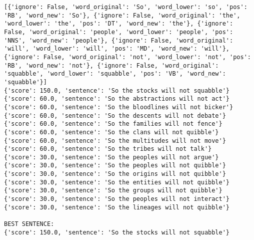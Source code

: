\documentclass[12pt,a4paper,oneside]{book}
\begin{document}
\begin{verbatim}
[{'ignore': False, 'word_original': 'So', 'word_lower': 'so', 'pos': 'RB', 'word_new': 'So'}, {'ignore': False, 'word_original': 'the', 'word_lower': 'the', 'pos': 'DT', 'word_new': 'the'}, {'ignore': False, 'word_original': 'people', 'word_lower': 'people', 'pos': 'NNS', 'word_new': 'people'}, {'ignore': False, 'word_original': 'will', 'word_lower': 'will', 'pos': 'MD', 'word_new': 'will'}, {'ignore': False, 'word_original': 'not', 'word_lower': 'not', 'pos': 'RB', 'word_new': 'not'}, {'ignore': False, 'word_original': 'squabble', 'word_lower': 'squabble', 'pos': 'VB', 'word_new': 'squabble'}]
{'score': 150.0, 'sentence': 'So the stocks will not squabble'}
{'score': 60.0, 'sentence': 'So the abstractions will not act'}
{'score': 60.0, 'sentence': 'So the bloodlines will not bicker'}
{'score': 60.0, 'sentence': 'So the descents will not debate'}
{'score': 60.0, 'sentence': 'So the families will not fence'}
{'score': 60.0, 'sentence': 'So the clans will not quibble'}
{'score': 60.0, 'sentence': 'So the multitudes will not move'}
{'score': 60.0, 'sentence': 'So the tribes will not talk'}
{'score': 30.0, 'sentence': 'So the peoples will not argue'}
{'score': 30.0, 'sentence': 'So the peoples will not quibble'}
{'score': 30.0, 'sentence': 'So the origins will not quibble'}
{'score': 30.0, 'sentence': 'So the entities will not quibble'}
{'score': 30.0, 'sentence': 'So the groups will not quibble'}
{'score': 30.0, 'sentence': 'So the peoples will not interact'}
{'score': 30.0, 'sentence': 'So the lineages will not quibble'}

BEST SENTENCE:
{'score': 150.0, 'sentence': 'So the stocks will not squabble'}



\end{verbatim}
\end{document}
